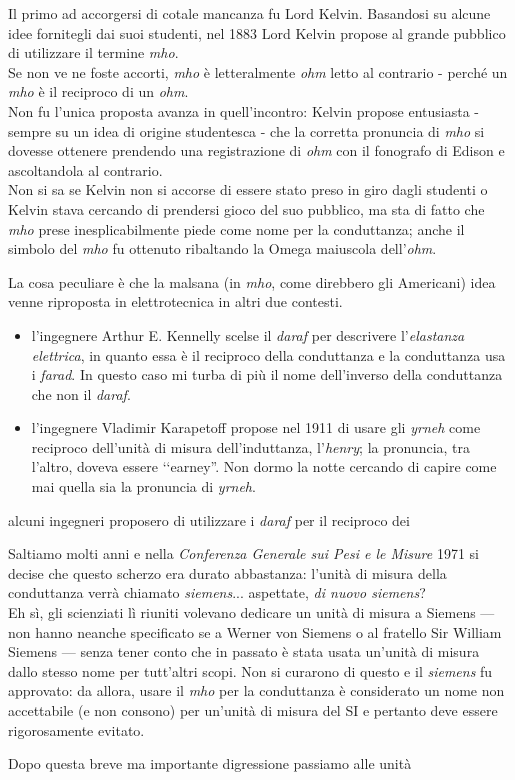 \begin{digressionwt}
	Il primo ad accorgersi di cotale mancanza fu Lord Kelvin. Basandosi su alcune idee fornitegli dai suoi studenti,  nel 1883 Lord Kelvin propose al grande pubblico di utilizzare il termine \textit{mho}.\\
	Se non ve ne foste accorti, \textit{mho} è letteralmente \textit{ohm} letto al contrario - perché un \textit{mho} è il reciproco di un \textit{ohm}.\\
	Non fu l'unica proposta avanza in quell'incontro: Kelvin propose entusiasta - sempre su un idea di origine studentesca - che la corretta pronuncia di \textit{mho} si dovesse ottenere prendendo una registrazione di \textit{ohm} con il fonografo di Edison e ascoltandola al contrario.\\
	Non si sa se Kelvin non si accorse di essere stato preso in giro dagli studenti o Kelvin stava cercando di prendersi gioco del suo pubblico, ma sta di fatto che \textit{mho} prese inesplicabilmente piede come nome per la conduttanza; anche il simbolo del \textit{mho} fu ottenuto ribaltando la Omega maiuscola dell'\textit{ohm}.

	La cosa peculiare è che la malsana (in \textit{mho}, come direbbero gli Americani) idea venne riproposta in elettrotecnica in altri due contesti.
	\begin{itemize}
		\item l'ingegnere Arthur E. Kennelly scelse il \textit{daraf} per descrivere l'\textit{elastanza elettrica}, in quanto essa è il reciproco della conduttanza e la conduttanza usa i \textit{farad}. In questo caso mi turba di più il nome dell'inverso della conduttanza che non il \textit{daraf}.
		\item l'ingegnere Vladimir Karapetoff propose nel 1911 di usare gli \textit{yrneh} come reciproco dell'unità di misura dell'induttanza, l'\textit{henry}; la pronuncia, tra l'altro, doveva essere ‘‘earney''. Non dormo la notte cercando di capire come mai quella sia la pronuncia di \textit{yrneh}.
	\end{itemize} alcuni ingegneri proposero di utilizzare i \textit{daraf} per il reciproco dei 
	
	Saltiamo molti anni e nella \textit{Conferenza Generale sui Pesi e le Misure} 1971 si decise che questo scherzo era durato abbastanza: l'unità di misura della conduttanza verrà chiamato \textit{siemens}... aspettate, \textit{di nuovo siemens}?\\
	Eh sì, gli scienziati lì riuniti volevano dedicare un unità di misura a Siemens --- non hanno neanche specificato se a Werner von Siemens o al fratello Sir William Siemens --- senza tener conto che in passato è stata usata un'unità di misura dallo stesso nome per tutt'altri scopi. Non si curarono di questo e il \textit{siemens} fu approvato: da allora, usare il \textit{mho} per la conduttanza è considerato un nome non accettabile (e non consono) per un'unità di misura del SI e pertanto deve essere rigorosamente evitato.
	
\end{digressionwt} %
Dopo questa breve ma importante digressione passiamo alle unità 
